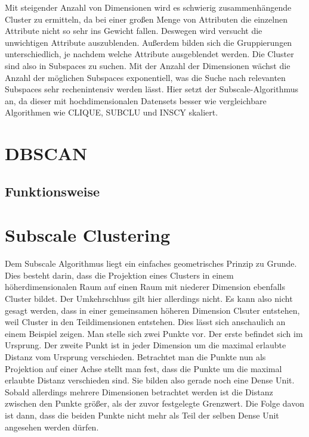 \documentclass[utf8,biblatex]{lni}
\begin{document}
Mit steigender Anzahl von Dimensionen wird es schwierig
zusammenhängende Cluster zu ermitteln,
da bei einer großen Menge von Attributen die einzelnen
Attribute nicht so sehr ins Gewicht fallen.
Deswegen wird versucht die unwichtigen Attribute auszublenden.
Außerdem bilden sich die Gruppierungen unterschiedlich,
je nachdem welche Attribute ausgeblendet werden.
Die Cluster sind also in Subspaces zu suchen.
Mit der Anzahl der Dimensionen wächst die Anzahl der
möglichen Subspaces exponentiell, was die
Suche nach relevanten Subspaces sehr rechenintensiv
werden lässt. Hier setzt der Subscale-Algorithmus an,
da dieser mit hochdimensionalen Datensets besser wie
vergleichbare Algorithmen wie CLIQUE, SUBCLU und INSCY
skaliert.

\section{DBSCAN}

\subsection{Funktionsweise}
\section{Subscale Clustering}

Dem Subscale Algorithmus liegt ein einfaches geometrisches Prinzip zu Grunde. 
Dies besteht darin, dass die Projektion eines Clusters in einem höherdimensionalen Raum auf einen Raum mit niederer Dimension ebenfalls Cluster bildet. 
Der Umkehrschluss gilt hier allerdings nicht. 
Es kann also nicht gesagt werden, dass in einer gemeinsamen höheren Dimension Clsuter entstehen, weil Cluster in den Teildimensionen entstehen. 
Dies lässt sich anschaulich an einem Beispiel zeigen.
Man stelle sich zwei Punkte vor. 
Der erste befindet sich im Ursprung. 
Der zweite Punkt ist in jeder Dimension um die maximal erlaubte Distanz vom Ursprung verschieden. 
Betrachtet man die Punkte nun als Projektion auf einer Achse stellt man fest, dass die Punkte um die maximal erlaubte Distanz verschieden sind. 
Sie bilden also gerade noch eine Dense Unit. 
Sobald allerdings mehrere Dimensionen betrachtet werden ist die Distanz zwischen den Punkte größer, als der zuvor festgelegte Grenzwert. 
Die Folge davon ist dann, dass die beiden Punkte nicht mehr als Teil der selben Dense Unit angesehen werden dürfen. 
\end{document}

